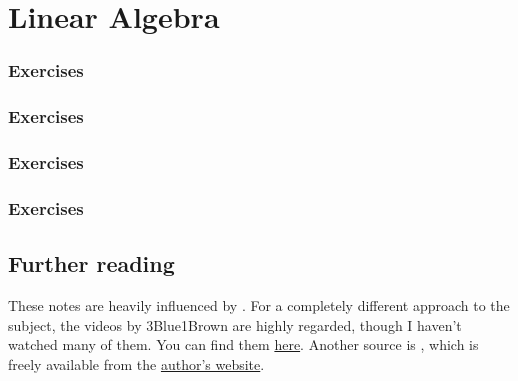 \documentclass{article}
\theoremstyle{plain}
\numberwithin{theorem}{subsection}
\begin{document}
\section{Linear Algebra}{
\let\section\subsection
\let\subsection\subsubsection

\subsubsection*{Exercises}



\subsubsection*{Exercises}



\subsubsection*{Exercises}



\subsubsection*{Exercises}


\section{Further reading}
These notes are heavily influenced by \cite{Ax15}. For a completely different approach to the subject, the videos by 3Blue1Brown are highly regarded, though I haven't watched many of them. You can find them \href{https://www.youtube.com/playlist?list=PLZHQObOWTQDPD3MizzM2xVFitgF8hE_ab}{here}. Another source is \cite{Tre17}, which is freely available from the \href{http://www.math.brown.edu/~treil/papers/LADW/LADW.html}{author's website}.}
\newpage
\end{document}

